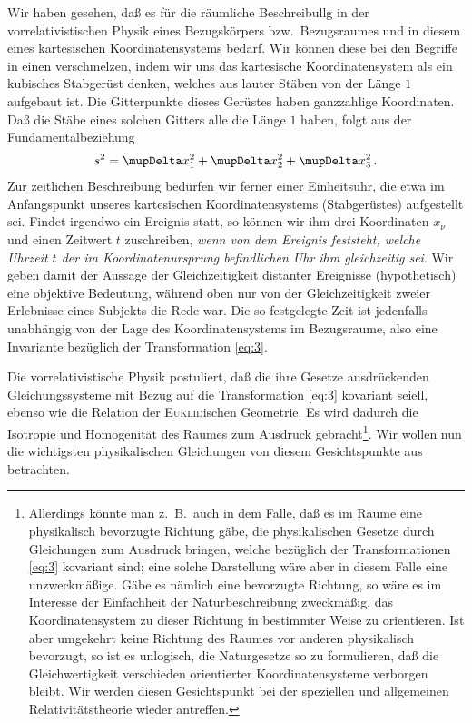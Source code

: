 Wir haben gesehen, daß es für die räumliche Beschreibullg in der 
vorrelativistischen Physik eines Bezugskörpers bzw.\ Bezugsraumes und in diesem 
eines kartesischen Koordinatensystems bedarf. Wir können diese bei den Begriffe 
in einen verschmelzen, indem wir uns das kartesische Koordinatensystem als ein 
kubisches Stabgerüst denken, welches aus lauter Stäben von der Länge $1$ 
aufgebaut ist. Die Gitterpunkte dieses Gerüstes haben ganzzahlige Koordinaten. 
Daß die Stäbe eines solchen Gitters alle die Länge $1$ haben, folgt aus der 
Fundamentalbeziehung
\begin{align*}
	s^2 = \Dva x_1^2 + \Dva x_2^2 + \Dva x_3^2\,.
\end{align*}
Zur zeitlichen Beschreibung bedürfen wir ferner einer Einheitsuhr, die etwa im 
Anfangspunkt unseres kartesischen Koordinatensystems (Stabgerüstes) aufgestellt
sei. Findet irgendwo ein Ereignis statt, so können wir ihm drei Koordinaten 
$x_{\nu}$ und einen Zeitwert $t$ zuschreiben, \emph{wenn von dem Ereignis 
feststeht, welche Uhrzeit $t$ der im Koordinatenursprung befindlichen Uhr ihm
gleichzeitig sei}. Wir geben damit der Aussage der Gleichzeitigkeit distanter 
Ereignisse (hypothetisch) eine objektive Bedeutung, während oben nur von der 
Gleichzeitigkeit zweier Erlebnisse eines Subjekts die Rede war. Die so 
festgelegte Zeit ist jedenfalls unabhängig von der Lage des Koordinatensystems 
im Bezugsraume, also eine Invariante bezüglich der Transformation \eqref{eq:3}.

Die vorrelativistische Physik postuliert, daß die ihre Gesetze ausdrückenden 
Gleichungssysteme mit Bezug auf die Transformation \eqref{eq:3} kovariant 
seiell, ebenso wie die Relation der \textsc{Euklid}ischen Geometrie. Es wird 
dadurch die Isotropie und Homogenität des Raumes zum Ausdruck 
gebracht\footnote{Allerdings könnte man z.\ B.\ auch in dem Falle, daß es im
Raume eine physikalisch bevorzugte Richtung gäbe, die physikalischen Gesetze 
durch Gleichungen zum Ausdruck bringen, welche bezüglich der Transformationen 
\eqref{eq:3} kovariant sind; eine solche Darstellung wäre aber in diesem Falle 
eine unzweckmäßige. Gäbe es nämlich eine bevorzugte Richtung, so wäre es im 
Interesse der Einfachheit der Naturbeschreibung zweckmäßig, das 
Koordinatensystem zu dieser Richtung in bestimmter Weise zu orientieren. Ist 
aber umgekehrt keine Richtung des Raumes vor anderen physikalisch bevorzugt, so 
ist es unlogisch, die Naturgesetze so zu formulieren, daß die Gleichwertigkeit 
verschieden orientierter Koordinatensysteme verborgen bleibt. Wir werden diesen 
Gesichtspunkt bei der speziellen und allgemeinen Relativitätstheorie wieder 
antreffen.}. Wir wollen nun die wichtigsten physikalischen Gleichungen von 
diesem Gesichtspunkte aus betrachten.

